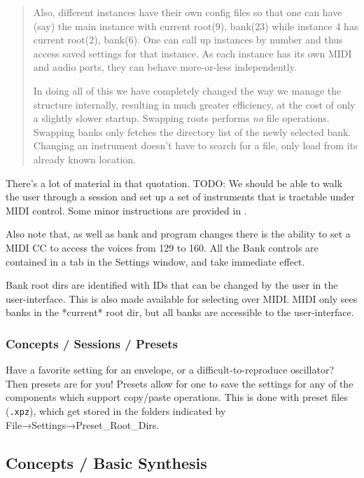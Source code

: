 \begin{quotation}
      Also, different instances have their own config files so that one can
      have (say) the main instance with current root(9), bank(23) while
      instance 4 has current root(2), bank(6). One can call up instances by
      number and thus access saved settings for that instance. As each
      instance has its own MIDI and audio ports, they can behave
      more-or-less independently.

      In doing all of this we have completely changed the way we manage the
      structure internally, resulting in much greater efficiency, at the
      cost of only a slightly slower startup. Swapping roots performs
      \textsl{no}
      file operations. Swapping banks only fetches the directory list of the
      newly selected bank. Changing an instrument doesn't have to search for
      a file, only load from its already known location.
   \end{quotation}

   There's a lot of material in that quotation.
   TODO:  We should be able to walk the user through a session and
   set up a set of instruments that is tractable under MIDI control.
   Some minor instructions are provided in
   .

   Also note that, as well as bank and program changes there is the ability
   to set a MIDI CC to access the voices from 129 to 160. All the Bank
   controls are contained in a tab in the Settings window, and take
   immediate effect.

   Bank root dirs are identified with IDs that can be changed by the user in
   the user-interface. This is also made available for selecting over MIDI.
   MIDI only sees banks in the *current* root dir, but all banks are
   accessible to the user-interface.

\subsubsection{Concepts / Sessions / Presets}
\label{subsec:concepts_sessions_presets}

   Have a favorite setting for an envelope, or a difficult-to-reproduce
   oscillator? Then presets are for you! Presets allow for one to save the
   settings for any of the components which support copy/paste operations.
   This is done with preset files (\texttt{.xpz}), which get stored in the
   folders indicated by File→Settings→Preset\_Root\_Dirs.

\subsection{Concepts / Basic Synthesis}
\label{subsec:concepts_basics}

